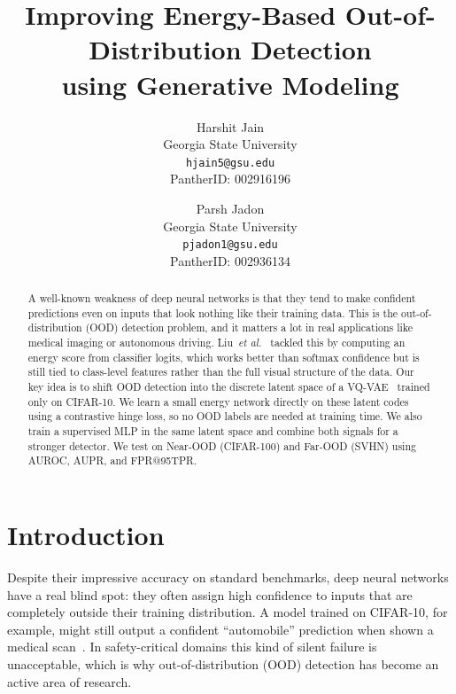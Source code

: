 \documentclass[10pt,twocolumn,letterpaper]{article}
\begin{document}
\title{\textbf{Improving Energy-Based Out-of-Distribution Detection\\
               using Generative Modeling}}

\author{
  Harshit Jain \\
  Georgia State University \\
  {\small\tt hjain5@gsu.edu} \\
  PantherID: 002916196
  \and
  Parsh Jadon \\
  Georgia State University \\
  {\small\tt pjadon1@gsu.edu} \\
  PantherID: 002936134
}

\date{}
\maketitle

\begin{abstract}
A well-known weakness of deep neural networks is that they tend to make
confident predictions even on inputs that look nothing like their
training data. This is the out-of-distribution (OOD) detection problem,
and it matters a lot in real applications like medical imaging or
autonomous driving. Liu~\emph{et al.}~\cite{liu2020energy} tackled this
by computing an energy score from classifier logits, which works better
than softmax confidence but is still tied to class-level features rather
than the full visual structure of the data.
Our key idea is to shift OOD detection into the discrete latent space of
a VQ-VAE~\cite{oord2017vqvae} trained only on CIFAR-10. We learn a
small energy network directly on these latent codes using a contrastive
hinge loss, so no OOD labels are needed at training time. We also train
a supervised MLP in the same latent space and combine both signals for a
stronger detector. We test on Near-OOD (CIFAR-100) and Far-OOD (SVHN)
using AUROC, AUPR, and FPR@95TPR.
\end{abstract}

\section{Introduction}

Despite their impressive accuracy on standard benchmarks, deep neural
networks have a real blind spot: they often assign high confidence to
inputs that are completely outside their training distribution. A model
trained on CIFAR-10, for example, might still output a confident
``automobile'' prediction when shown a medical scan~\cite{nguyen2015deep}.
In safety-critical domains this kind of silent failure is unacceptable,
which is why out-of-distribution (OOD) detection has become an active
area of research.
\end{document}
